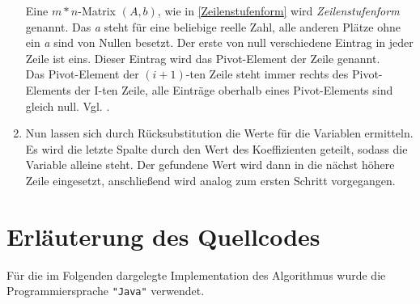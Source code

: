 \documentclass[a4paper, 12pt]{report}
\begin{document}
\begin{enumerate}
        Eine $ m * n $-Matrix $(A,b)$, wie in \ref{Zeilenstufenform} wird  \textit{Zeilenstufenform} genannt.
        Das \textit{a} steht für eine beliebige reelle Zahl, alle anderen Plätze ohne ein \textit{a} sind von Nullen besetzt.
        Der erste von null verschiedene Eintrag in jeder Zeile ist eins. Dieser Eintrag wird das Pivot-Element der Zeile genannt. \\
        Das Pivot-Element der $(i + 1)$-ten Zeile steht immer rechts des Pivot-Elements der I-ten Zeile, alle Einträge
        oberhalb eines Pivot-Elements sind gleich null. Vgl. \cite{5}.
    \item Nun lassen sich durch Rücksubstitution die Werte für die Variablen ermitteln.
        Es wird die letzte Spalte durch den Wert des Koeffizienten geteilt, sodass die Variable alleine steht.
        Der gefundene Wert wird dann in die nächst höhere Zeile eingesetzt, anschließend wird analog zum ersten Schritt vorgegangen.
\end{enumerate}

{\let\clearpage\relax \chapter{Erläuterung des Quellcodes}}
Für die im Folgenden dargelegte Implementation des Algorithmus wurde die Programmiersprache \texttt{"Java"} verwendet. \newpage
\end{document}
